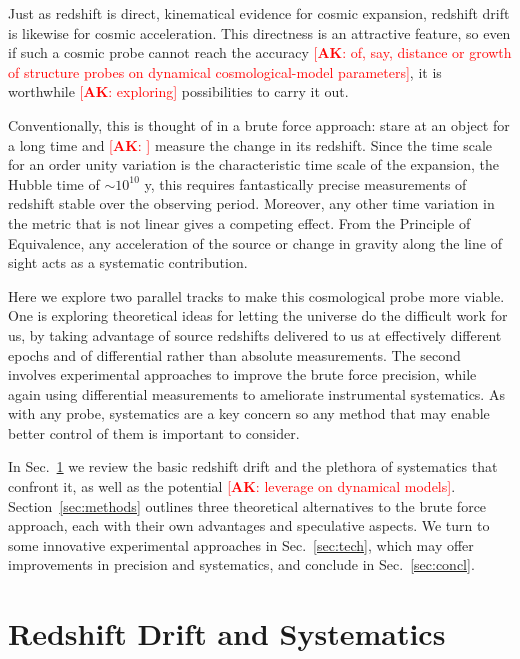 \documentclass[preprint2, 10pt]{aastex}
\newcommand{\alex}[1]{\textcolor{red}{[{\bf AK}: #1]}}
\begin{document}
Just as redshift is direct, kinematical evidence for cosmic expansion, 
redshift drift is likewise for cosmic acceleration.  This directness is 
an attractive feature, so even if such a cosmic probe cannot reach the 
accuracy \alex{of, say, distance or growth 
of structure probes on  dynamical cosmological-model parameters}, it is worthwhile \alex{exploring} possibilities to carry 
it out. 

Conventionally, this is thought of in a brute force approach: stare at an 
object for a long time and \alex{} measure the change in its redshift.  
Since the time scale for an order unity variation is the characteristic 
time scale of the expansion, the Hubble time of $\sim10^{10}$ y, this 
requires fantastically precise measurements of redshift stable over the 
observing period.  Moreover, any other time variation in the metric that 
is not linear gives a competing effect.  From the Principle of Equivalence, 
any acceleration of the source or change in gravity along the line of sight 
acts as a systematic contribution. 

Here we explore two parallel tracks to make this cosmological probe more 
viable. One is exploring theoretical ideas for letting the universe do the 
difficult work for us, by taking advantage of source redshifts delivered 
to us at effectively different epochs and of differential rather than absolute 
measurements.  The second involves experimental approaches to improve the 
brute force precision, while again using differential measurements to 
ameliorate instrumental systematics. As with any probe, systematics are a 
key concern so any method that may enable better control of them is 
important to consider. 

In Sec.~\ref{sec:basic} we review the basic redshift drift and the plethora 
of systematics that confront it, as well as the potential \alex{leverage on
dynamical models}.  Section~\ref{sec:methods} outlines three theoretical 
alternatives to the brute force approach, each with their own advantages 
and speculative aspects. 
We turn to some innovative experimental approaches in Sec.~\ref{sec:tech}, 
which may offer improvements in precision and systematics, and conclude in 
Sec.~\ref{sec:concl}. 


\section{Redshift Drift and Systematics} \label{sec:basic} 
\end{document}
